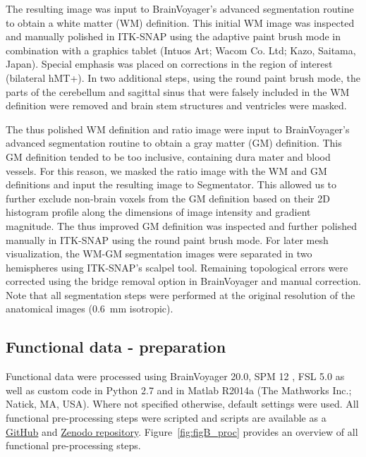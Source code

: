 The resulting image was input to BrainVoyager's advanced segmentation routine to obtain a white matter (WM) definition. This initial WM image was inspected and manually polished in ITK-SNAP using the adaptive paint brush mode in combination with a graphics tablet (Intuos Art; Wacom Co. Ltd; Kazo, Saitama, Japan). Special emphasis was placed on corrections in the region of interest (bilateral hMT+). In two additional steps, using the round paint brush mode, the parts of the cerebellum and sagittal sinus that were falsely included in the WM definition were removed and brain stem structures and ventricles were masked.

The thus polished WM definition and ratio image were input to BrainVoyager's advanced segmentation routine to obtain a gray matter (GM) definition. This GM definition tended to be too inclusive, containing dura mater and blood vessels. For this reason, we masked the ratio image with the WM and GM definitions and input the resulting image to Segmentator. This allowed us to further exclude non-brain voxels from the GM definition based on their 2D histogram profile along the dimensions of image intensity and gradient magnitude. The thus improved GM definition was inspected and further polished manually in ITK-SNAP using the round paint brush mode. For later mesh visualization, the WM-GM segmentation images were separated in two hemispheres using ITK-SNAP's scalpel tool. Remaining topological errors were corrected using the bridge removal option in BrainVoyager \parencite{Kriegeskorte2001} and manual correction. Note that all segmentation steps were performed at the original resolution of the anatomical images (0.6~mm isotropic).

\subsection{Functional data - preparation}
Functional data were processed using BrainVoyager 20.0, SPM 12 \parencite{Friston2006}, FSL 5.0 \parencite{Jenkinson2012} as well as custom code in Python 2.7 \parencite{numpy2011, scipy2001, matplotlib2007} and in Matlab R2014a (The Mathworks Inc.; Natick, MA, USA). Where not specified otherwise, default settings were used. All functional pre-processing steps were scripted and scripts are available as a \href{https://github.com/MSchnei/motion_quartet_scripts}{GitHub} and \href{https://zenodo.org/record/1489246}{Zenodo repository}. Figure~\ref{fig:figB_proc} provides an overview of all functional pre-processing steps. 

